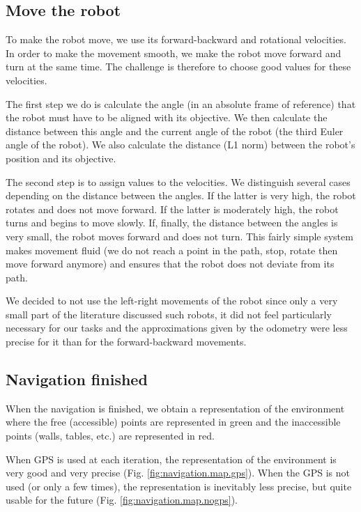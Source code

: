 \documentclass[a4paper, 10pt, conference]{ieeeconf}
\begin{document}
    \subsection{Move the robot}
    
    To make the robot move, we use its forward-backward and rotational velocities. In order to make the movement smooth, we make the robot move forward and turn at the same time. The challenge is therefore to choose good values for these velocities.
    
    The first step we do is calculate the angle (in an absolute frame of reference) that the robot must have to be aligned with its objective. We then calculate the distance between this angle and the current angle of the robot (the third Euler angle of the robot). We also calculate the distance (L1 norm) between the robot's position and its objective.
    
    The second step is to assign values to the velocities. We distinguish several cases depending on the distance between the angles. If the latter is very high, the robot rotates and does not move forward. If the latter is moderately high, the robot turns and begins to move slowly. If, finally, the distance between the angles is very small, the robot moves forward and does not turn. This fairly simple system makes movement fluid (we do not reach a point in the path, stop, rotate then move forward anymore) and ensures that the robot does not deviate from its path.
    
    We decided to not use the left-right movements of the robot since only a very small part of the literature discussed such robots, it did not feel particularly necessary for our tasks and the approximations given by the odometry were less precise for it than for the forward-backward movements.
    
    \subsection{Navigation finished}
    
    When the navigation is finished, we obtain a representation of the environment where the free (accessible) points are represented in green and the inaccessible points (walls, tables, etc.) are represented in red.
    
    When GPS is used at each iteration, the representation of the environment is very good and very precise (Fig. \ref{fig:navigation.map.gps}). When the GPS is not used (or only a few times), the representation is inevitably less precise, but quite usable for the future (Fig. \ref{fig:navigation.map.nogps}).
    
\end{document}
